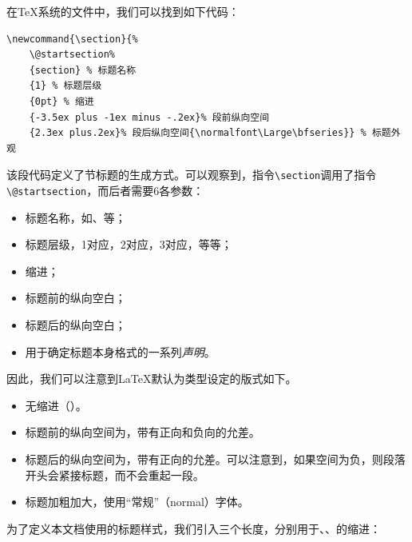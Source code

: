 在\TeX 系统的文件中，我们可以找到如下代码：

\begin{dmd}
\begin{verbatim}
\newcommand{\section}{%
    \@startsection%
    {section} % 标题名称
    {1} % 标题层级
    {0pt} % 缩进
    {-3.5ex plus -1ex minus -.2ex}% 段前纵向空间
    {2.3ex plus.2ex}% 段后纵向空间{\normalfont\Large\bfseries}} % 标题外观
\end{verbatim}
\end{dmd}

该段代码定义了节标题的生成方式。可以观察到，指令\verb|\section|调用了指令\verb|\@startsection|，而后者需要6各参数：

\begin{itemize}
    \item 标题名称，如、等；
    \item 标题层级，1对应，2对应，3对应，等等；
    \item 缩进；
    \item 标题前的纵向空白；
    \item 标题后的纵向空白；
    \item 用于确定标题本身格式的一系列\emph{声明}。
\end{itemize}

因此，我们可以注意到\LaTeX 默认为类型设定的版式如下。

\begin{itemize}
    \item 无缩进（\dm{0pt}）。
    \item 标题前的纵向空间为\dm{3.5ex}，带有正向\dm{-1ex}和负向\dm{-.2ex}的允差。
    \item 标题后的纵向空间为\dm{2.3ex}，带有正向\dm{.2ex}的允差。可以注意到，如果空间为负，则段落开头会紧接标题，而不会重起一段。
    \item 标题加粗加大，使用“常规”（normal）字体。
\end{itemize}

为了定义本文档使用的标题样式，我们引入三个长度，分别用于、、的缩进：

